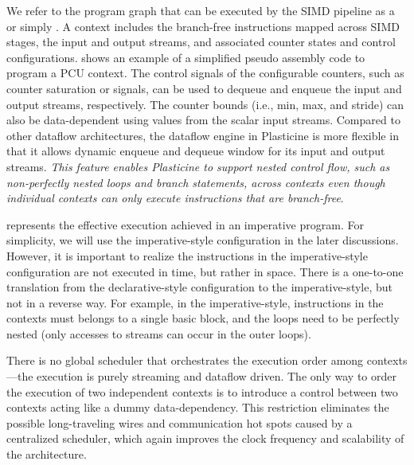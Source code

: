 We refer to the program graph that can be executed by the SIMD pipeline as a  or
simply . 
A context includes the branch-free instructions mapped across SIMD stages, the input and output streams, and associated counter states and control configurations.
 shows an example of a simplified pseudo assembly code to program a PCU context.
The control signals of the configurable counters, such as counter saturation or 
signals, can be used to dequeue and enqueue the input and output streams, respectively.
The counter bounds (i.e., min, max, and stride) can also be data-dependent using values from the scalar input streams. Compared to other dataflow architectures, the dataflow engine in Plasticine is more flexible in that it allows dynamic enqueue and dequeue window for its input and output streams.
\emph{This feature enables Plasticine to support nested control flow, such as non-perfectly nested loops and
branch statements, across contexts even though individual contexts can only execute instructions that are
branch-free}. 

 represents the effective execution achieved in an imperative program.
For simplicity, we will use the imperative-style configuration in the later discussions.
However, it is important to realize the instructions in the imperative-style configuration are not
executed in time, but rather in space.
There is a one-to-one translation from the declarative-style configuration to the imperative-style, but not in a reverse way.
For example, in the imperative-style, 
instructions in the contexts must belongs to a single basic block, and the loops need to be
perfectly nested (only accesses to streams can occur in the outer loops).

There is no global scheduler that orchestrates the execution order among contexts---the execution is purely
streaming and dataflow driven. 
The only way to order the execution of two independent contexts is to introduce a control  between two contexts acting like a dummy data-dependency.
This restriction eliminates the possible long-traveling wires and communication hot spots caused by a
centralized scheduler, which again improves the clock frequency and scalability of the architecture.

